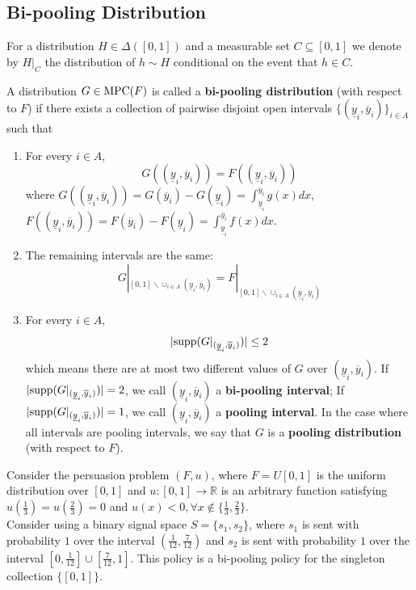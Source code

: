 \documentclass[11pt]{elegantbook}
\begin{document}
\subsection{Bi-pooling Distribution}
\begin{note}
    For a distribution $H \in \Delta([0,1])$ and a measurable set $C \subseteq[0,1]$ we denote by $H|_C$ the distribution of $h \sim H$ conditional on the event that $h\in C$.
\end{note}

\begin{definition}
    \normalfont
    A distribution $G \in \textnormal{MPC}(F)$ is called a \textbf{bi-pooling distribution} (with respect to $F$) if there exists a collection of pairwise disjoint open intervals $\{(\underline{y}_i,\overline{y}_i)\}_{i\in A}$ such that
    \begin{enumerate}[$\circ$]
        \item For every $i\in A$, $$G((\underline{y}_i,\overline{y}_i))=F((\underline{y}_i,\overline{y}_i))$$
        where $G((\underline{y}_i,\overline{y}_i))=G(\overline{y}_i)-G(\underline{y}_i)=\int_{\underline{y}_i}^{\overline{y}_i}g(x)dx$, $F((\underline{y}_i,\overline{y}_i))=F(\overline{y}_i)-F(\underline{y}_i)=\int_{\underline{y}_i}^{\overline{y}_i}f(x)dx$.
        \item The remaining intervals are the same: $$G|_{[0,1]\backslash \cup_{i\in A}(\underline{y}_i,\overline{y}_i)}=F|_{[0,1]\backslash \cup_{i\in A}(\underline{y}_i,\overline{y}_i)}$$
        \item For every $i\in A$, $$|\textnormal{supp}(G|_{(\underline{y}_i,\overline{y}_i)})|\leq 2$$
        which means there are at most two different values of $G$ over $(\underline{y}_i,\overline{y}_i)$. If $|\textnormal{supp}(G|_{(\underline{y}_i,\overline{y}_i)})|=2$, we call $(\underline{y}_i,\overline{y}_i)$ a \textbf{bi-pooling interval}; If $|\textnormal{supp}(G|_{(\underline{y}_i,\overline{y}_i)})|=1$, we call $(\underline{y}_i,\overline{y}_i)$ a \textbf{pooling interval}. In the case where all intervals are pooling intervals, we say that $G$ is a \textbf{pooling distribution} (with respect to $F$).
    \end{enumerate}
\end{definition}
\begin{example}
    Consider the persuasion problem $(F, u)$, where $F = U [0, 1]$ is the uniform
    distribution over $[0, 1]$ and $u:[0,1] \rightarrow \mathbb{R}$ is an arbitrary function satisfying $u(\frac{1}{3})=u(\frac{2}{3})=0$ and $u(x)<0,\forall x\notin \{\frac{1}{3},\frac{2}{3}\}$.\\Consider using a binary signal space $S=\{s_1,s_2\}$, where $s_1$ is sent with probability $1$ over the interval $(\frac{1}{12},\frac{7}{12})$ and $s_2$ is sent with probability $1$ over the interval $[0,\frac{1}{12}]\cup[\frac{7}{12},1]$. This policy is a bi-pooling policy for the singleton collection $\{[0,1]\}$.
\end{example}
\end{document}

